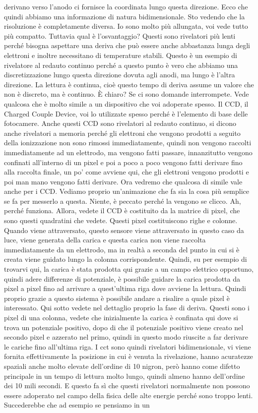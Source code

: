 derivano verso l'anodo ci fornisce la coordinata lungo questa direzione. Ecco che quindi abbiamo una informazione di natura bidimensionale. Sto vedendo che la risoluzione è completamente diversa. Io sono molto più allungata, voi vede tutto più compatto. Tuttavia qual è l'osvantaggio? Questi sono rivelatori più lenti perché bisogna aspettare una deriva che può essere anche abbastanza lunga degli elettroni e inoltre necessitano di temperature stabili. Questo è un esempio di rivelatore al redauto continuo perché a questo punto è vero che abbiamo una discretizzazione lungo questa direzione dovuta agli anodi, ma lungo è l'altra direzione. La lettura è continua, cioè questo tempo di deriva assume un valore che non è discreto, ma è continuo. È chiaro? Se ci sono domande interrompete. Vede qualcosa che è molto simile a un dispositivo che voi adoperate spesso. Il CCD, il Charged Couple Device, voi lo utilizzate spesso perché è l'elemento di base delle fotocamere. Anche questi CCD sono rivelatori al redauto continuo, si dicono anche rivelatori a memoria perché gli elettroni che vengono prodotti a seguito della ionizzazione non sono rimossi immediatamente, quindi non vengono raccolti immediatamente ad un elettrodo, ma vengono fatti passare, innanzitutto vengono confinati all'interno di un pixel e poi a poco a poco vengono fatti derivare fino alla raccolta finale, un po' come avviene qui, che gli elettroni vengono prodotti e poi man mano vengono fatti derivare. Ora vedremo che qualcosa di simile vale anche per i CCD. Vediamo proprio un'animazione che fa sia la cosa più semplice se fa per messerlo a questa. Niente, è peccato perché la vengono se clicco. Ah, perché funziona. Allora, vedete il CCD è costituito da la matrice di pixel, che sono questi quadratini che vedete. Questi pixel costituiscono righe e colonne. Quando viene attraversato, questo sensore viene attraversato in questo caso da luce, viene generata della carica e questa carica non viene raccolta immediatamente da un elettrodo, ma in realtà a seconda del punto in cui si è creata viene guidato lungo la colonna corrispondente. Quindi, su per esempio di trovarvi qui, la carica è stata prodotta qui grazie a un campo elettrico opportuno, quindi adere differenze di potenziale, è possibile guidare la carica prodotta da pixel a pixel fino ad arrivare a quest'ultima riga dove avviene la lettura. Quindi proprio grazie a questo sistema è possibile andare a risalire a quale pixel è interessato. Qui sotto vedete nel dettaglio proprio la fase di deriva. Questi sono i pixel di una colonna, vedete che inizialmente la carica è confinata qui dove si trova un potenziale positivo, dopo di che il potenziale positivo viene creato nel secondo pixel e azzerato nel primo, quindi in questo modo riuscite a far derivare le cariche fino all'ultima riga. I cct sono quindi rivelatori bidimensionale, vi viene fornita effettivamente la posizione in cui è venuta la rivelazione, hanno acuratezze spaziali anche molto elevate dell'ordine di 10 nigron, però hanno come difetto principale in un tempo di lettura molto lungo, quindi almeno hanno dell'ordine dei 10 mili secondi. E questo fa sì che questi rivelatori normalmente non possono essere adoperato nel campo della fisica delle alte energie perché sono troppo lenti. Succederebbe che ad esempio se pensiamo in un 
